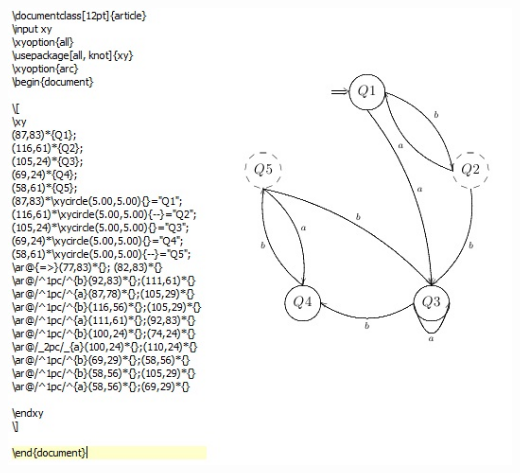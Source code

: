 \documentclass[12pt,a4paper,spanish]{book}
\begin{document}
\begin{itemize}
\begin{enumerate}
\begin{center}
\includegraphics[width=\textwidth]{late1.jpg}
\end{center}


\end{enumerate}
\end{itemize}
\end{document}
